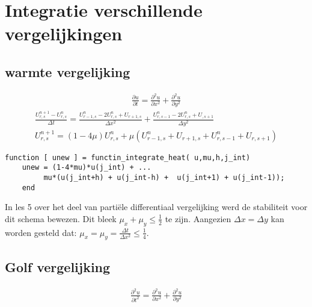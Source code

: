 \documentclass[11pt]{article} %
\begin{document}
\section{Integratie verschillende vergelijkingen}

	\subsection{warmte vergelijking}
		\begin{eqnarray}
			\frac{\partial u}{\partial t} = 
			\frac{\partial ^2 u}{\partial x^2} + 
			\frac{\partial ^2 u}{\partial  y^2} 	
		\end{eqnarray}
		\begin{eqnarray}
			\frac{U_{r,s}^{n+1} - U_{r,s}^n}{\Delta t} =
			\frac{U_{r-1,s}^n - 2 U_{r,s}^n + U_{r+1,s}}{\Delta x^2} + 
			\frac{U_{r,s-1}^n - 2 U_{r,s}^n + U_{,s+1} }{\Delta y^2} \\
			U_{r,s}^{n+1} =( 1-4\mu )U_{r,s}^n + \mu (U_{r-1,s}^n  + U_{r+1,s} + 
			U_{r,s-1}^n  + U_{r,s+1})
		\end{eqnarray}

\begin{lstlisting}[caption=Code Explicit Euler,label={lst:expl_euler}]
function [ unew ] = functin_integrate_heat( u,mu,h,j_int)
	unew = (1-4*mu)*u(j_int) + ... 
	     mu*(u(j_int+h) + u(j_int-h) +  u(j_int+1) + u(j_int-1));
	end
\end{lstlisting}
		In les 5 over het deel van partiële differentiaal vergelijking werd de stabiliteit voor dit schema bewezen. Dit bleek $\mu_x + \mu_y \leq \frac{1}{2}$ te zijn. Aangezien $\Delta x = \Delta y$ kan worden gesteld dat: $\mu_x = \mu_y =\frac{\Delta t}{\Delta x^2} \leq \frac{1}{4}$.
		
	\subsection{Golf vergelijking}
		\begin{eqnarray}
		\frac{\partial^2 u}{\partial t^2} = 
		\frac{\partial ^2 u}{\partial x^2} + 
		\frac{\partial ^2 u}{\partial  y^2} 	
		\end{eqnarray}
\end{document}
